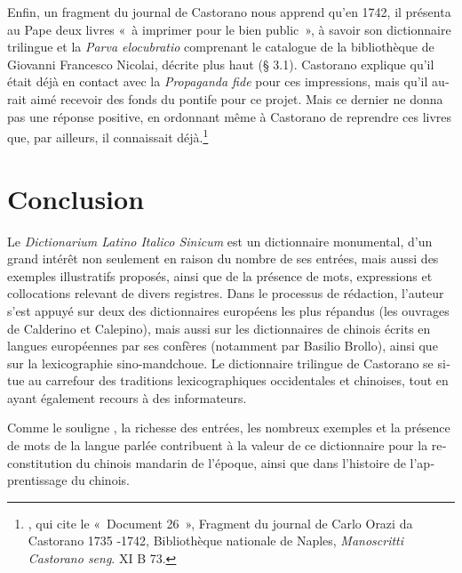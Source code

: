 \documentclass[output=paper,colorlinks,citecolor=brown,arabicfont,chinesefont,booklanguage=french]{langscibook}
\begin{document}
\begin{otherlanguage}{french}
Enfin, un fragment du journal de Castorano nous apprend qu’en 1742, il présenta au Pape deux livres «~à imprimer pour le bien public~», à savoir son dictionnaire trilingue et la \emph{Parva elocubratio} comprenant le catalogue de la bibliothèque de Giovanni Francesco Nicolai, décrite plus haut (§ 3.1). Castorano explique qu’il était déjà en contact avec la \emph{Propaganda fide} pour ces impressions, mais qu’il aurait aimé recevoir des fonds du pontife pour ce projet. Mais ce dernier ne donna pas une réponse positive, en ordonnant même à Castorano de reprendre ces livres que, par ailleurs, il connaissait déjà.\footnote{\citet[450]{DiFiori1989}, qui cite le «~Document 26~», Fragment du journal de Carlo Orazi da Castorano 1735 -1742, Bibliothèque nationale de Naples, \emph{Manoscritti Castorano seng}. XI B 73.}

\section{Conclusion}

Le \emph{Dictionarium Latino Italico Sinicum} est un dictionnaire monumental, d’un grand intérêt non seulement en raison du nombre de ses entrées, mais aussi des exemples illustratifs proposés, ainsi que de la présence de mots, expressions et collocations relevant de divers registres. Dans le processus de rédaction, l’auteur s’est appuyé sur deux des dictionnaires européens les plus répandus (les ouvrages de Calderino et Calepino), mais aussi sur les dictionnaires de chinois écrits en langues européennes par ses confères (notamment par Basilio Brollo), ainsi que sur la lexicographie sino-mandchoue. Le dictionnaire trilingue de Castorano se situe au carrefour des traditions lexicographiques occidentales et chinoises, tout en ayant également recours à des informateurs. 

Comme le souligne \citet[176]{Li2017}, la richesse des entrées, les nombreux exemples et la présence de mots de la langue parlée contribuent à la valeur de ce dictionnaire pour la reconstitution du chinois mandarin de l’époque, ainsi que dans l’histoire de l’apprentissage du chinois. 


\end{otherlanguage}
\end{document}
